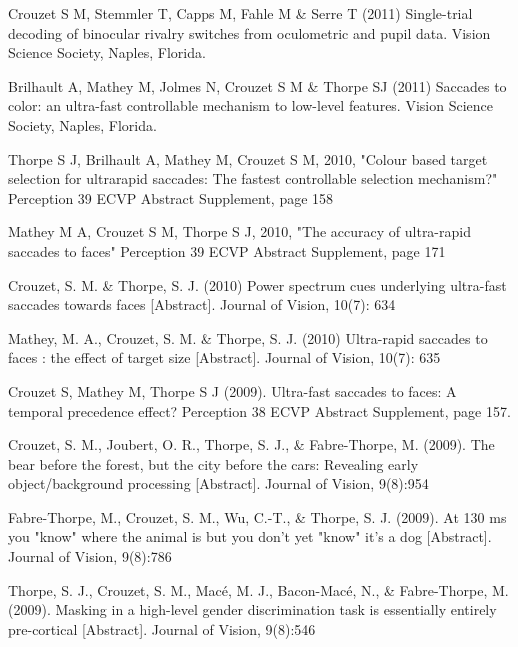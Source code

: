 \documentclass[margin,line]{resume}
\begin{document}
\begin{resume}
	\vspace{-2mm} Crouzet S M, Stemmler T, Capps M, Fahle M \& Serre T (2011) Single-trial decoding of binocular rivalry switches from oculometric and pupil data. Vision Science Society, Naples, Florida.

	\vspace{-2mm} Brilhault A, Mathey M, Jolmes N, Crouzet S M \& Thorpe SJ (2011) Saccades to color: an ultra-fast controllable mechanism to low-level features. Vision Science Society, Naples, Florida.

	\vspace{-2mm} Thorpe S J, Brilhault A, Mathey M, Crouzet S M, 2010, "Colour based target selection for ultrarapid saccades: The fastest controllable selection mechanism?" Perception 39 ECVP Abstract Supplement, page 158

	\vspace{-2mm} Mathey M A, Crouzet S M, Thorpe S J, 2010, "The accuracy of ultra-rapid saccades to faces" Perception 39 ECVP Abstract Supplement, page 171

	\vspace{-2mm} Crouzet, S. M. \& Thorpe, S. J. (2010) Power spectrum cues underlying ultra-fast saccades towards faces [Abstract]. Journal of Vision, 10(7): 634

	\vspace{-2mm} Mathey, M. A., Crouzet, S. M. \& Thorpe, S. J. (2010) Ultra-rapid saccades to faces : the effect of target size [Abstract]. Journal of Vision, 10(7): 635

	\vspace{-2mm} Crouzet S, Mathey M, Thorpe S J (2009). Ultra-fast saccades to faces: A temporal precedence effect? Perception 38 ECVP Abstract Supplement, page 157.

	\vspace{-2mm} Crouzet, S. M., Joubert, O. R., Thorpe, S. J., \& Fabre-Thorpe, M. (2009). The bear before the forest, but the city before the cars: Revealing early object/background processing [Abstract]. Journal of Vision, 9(8):954

	\vspace{-2mm} Fabre-Thorpe, M., Crouzet, S. M., Wu, C.-T., \& Thorpe, S. J. (2009). At 130 ms you "know" where the animal is but you don't yet "know" it's a dog [Abstract]. Journal of Vision, 9(8):786

	\vspace{-2mm} Thorpe, S. J., Crouzet, S. M., Macé, M. J., Bacon-Macé, N., \& Fabre-Thorpe, M. (2009). Masking in a high-level gender discrimination task is essentially entirely pre-cortical [Abstract]. Journal of Vision, 9(8):546


\end{resume}
\end{document}
